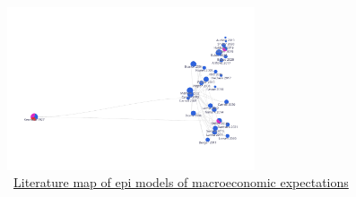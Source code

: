 \begin{figure}[!ht] \centering  %
	\caption{ ~\href{https://app.litmaps.co/shared/289F57F4-FDE5-4F94-B1A9-2BA7419DB719}{Literature map of epi models of macroeconomic expectations}}
	\label{fig:graph_macro}
	\centerline{\includegraphics[width=0.65\textwidth]{./figures/graph_macro}}
\end{figure}